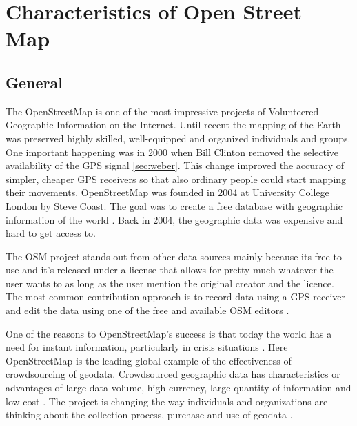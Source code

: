 \chapter{Characteristics of Open Street Map}
	
\section{General}
The OpenStreetMap is one of the most impressive projects of Volunteered Geographic Information on the Internet\cite{Neis2012}. Until recent the mapping of the Earth was preserved highly skilled, well-equipped and organized individuals and groups. One important happening was in 2000 when Bill Clinton removed the selective availability of the GPS signal \ref{sec:weber}. This change improved the accuracy of simpler, cheaper GPS receivers so that also ordinary people could start mapping their movements. OpenStreetMap was founded in 2004 at University College London by Steve Coast. The goal was to create a free database with geographic information of the world \cite{Neis2012}. Back in 2004, the geographic data was expensive and hard to get access to. 

The OSM project stands out from other data sources mainly because its free to use and it's released under a license that allows for pretty much whatever the user wants to as long as the user mention the original creator and the licence\cite{Chilton}.  The most common contribution approach is to record data using a GPS receiver and edit the data using one of the free and available OSM editors \cite{Neis2012}.  

One of the reasons to OpenStreetMap's success is that today the world has a need for instant information, particularly in crisis situations \cite{Chilton}. Here OpenStreetMap is the leading global example of the effectiveness of crowdsourcing of geodata. Crowdsourced geographic data has characteristics or advantages of large data volume, high currency, large quantity of information and low cost \cite{Wang2013}. The project is changing the way individuals and organizations are thinking about the collection process, purchase and use of geodata \cite{Chilton}.  


